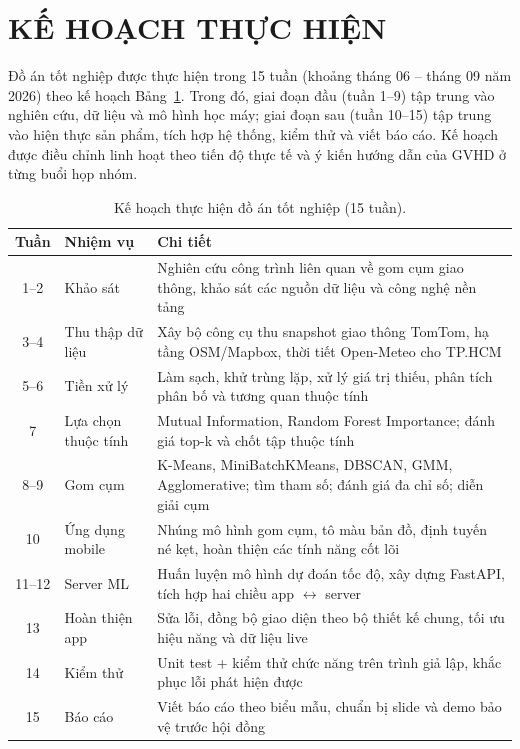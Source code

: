 \documentclass[12pt,a4paper]{report}
\begin{document}



\chapter*{KẾ HOẠCH THỰC HIỆN}

Đồ án tốt nghiệp được thực hiện trong 15 tuần (khoảng tháng 06 -- tháng 09 năm 2026) theo kế hoạch Bảng~\ref{tab:plan}. Trong đó, giai đoạn đầu (tuần 1--9) tập trung vào nghiên cứu, dữ liệu và mô hình học máy; giai đoạn sau (tuần 10--15) tập trung vào hiện thực sản phẩm, tích hợp hệ thống, kiểm thử và viết báo cáo. Kế hoạch được điều chỉnh linh hoạt theo tiến độ thực tế và ý kiến hướng dẫn của GVHD ở từng buổi họp nhóm.

\begin{table}[h!]
\centering
\caption{Kế hoạch thực hiện đồ án tốt nghiệp (15 tuần).}
\label{tab:plan}
\small
\begin{tabularx}{\textwidth}{clX}
\toprule
\textbf{Tuần} & \textbf{Nhiệm vụ} & \textbf{Chi tiết}\\
\midrule
1--2 & Khảo sát & Nghiên cứu công trình liên quan về gom cụm giao thông, khảo sát các nguồn dữ liệu và công nghệ nền tảng\\
3--4 & Thu thập dữ liệu & Xây bộ công cụ thu snapshot giao thông TomTom, hạ tầng OSM/Mapbox, thời tiết Open-Meteo cho TP.HCM\\
5--6 & Tiền xử lý & Làm sạch, khử trùng lặp, xử lý giá trị thiếu, phân tích phân bố và tương quan thuộc tính\\
7 & Lựa chọn thuộc tính & Mutual Information, Random Forest Importance; đánh giá top-k và chốt tập thuộc tính\\
8--9 & Gom cụm & K-Means, MiniBatchKMeans, DBSCAN, GMM, Agglomerative; tìm tham số; đánh giá đa chỉ số; diễn giải cụm\\
10 & Ứng dụng mobile & Nhúng mô hình gom cụm, tô màu bản đồ, định tuyến né kẹt, hoàn thiện các tính năng cốt lõi\\
11--12 & Server ML & Huấn luyện mô hình dự đoán tốc độ, xây dựng FastAPI, tích hợp hai chiều app $\leftrightarrow$ server\\
13 & Hoàn thiện app & Sửa lỗi, đồng bộ giao diện theo bộ thiết kế chung, tối ưu hiệu năng và dữ liệu live\\
14 & Kiểm thử & Unit test + kiểm thử chức năng trên trình giả lập, khắc phục lỗi phát hiện được\\
15 & Báo cáo & Viết báo cáo theo biểu mẫu, chuẩn bị slide và demo bảo vệ trước hội đồng\\
\bottomrule
\end{tabularx}
\end{table}
\end{document}
